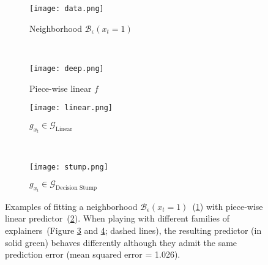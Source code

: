 \begin{figure}	
	\begin{subfigure}{0.225\textwidth}
		\centering
		\texttt{[image: data.png]}
		\caption{Neighborhood $\mathcal{B}_{\epsilon}(x_t=1)$}\label{fig:data}
	\end{subfigure}
	~
	\begin{subfigure}{0.225\textwidth}
		\centering
		\texttt{[image: deep.png]}
		\caption{Piece-wise linear $f$}\label{fig:deep}
	\end{subfigure}


	\begin{subfigure}{0.225\textwidth}
		\centering
		\texttt{[image: linear.png]}
		\caption{$g_{x_t} \in \mathcal{G}_{\text{Linear}}$}\label{fig:linear}
	\end{subfigure}
	~
	\begin{subfigure}{0.225\textwidth}
		\centering
		\texttt{[image: stump.png]}
		\caption{$g_{x_t} \in \mathcal{G}_{\text{Decision Stump}}$}\label{fig:stump}
	\end{subfigure}

	\caption{Examples of fitting a neighborhood $\mathcal{B}_{\epsilon}(x_t=1)$~(\ref{fig:data}) with piece-wise linear predictor~(\ref{fig:deep}). When playing with different families of explainers~(Figure \ref{fig:linear} and \ref{fig:stump}; dashed lines), the resulting predictor (in solid green) behaves differently although they admit the same prediction error (mean squared error = 1.026).}\label{fig:synthetic}
    \vspace{-1mm}
\end{figure}

